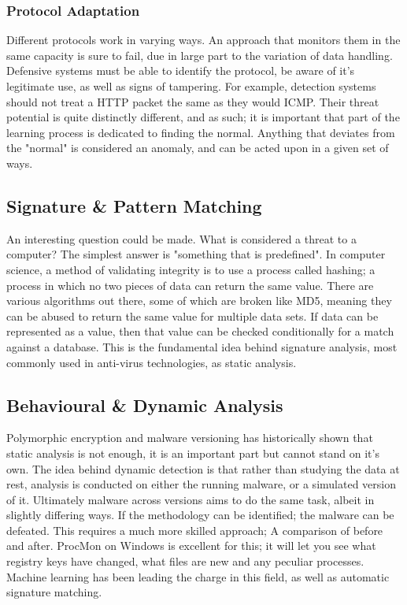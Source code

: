 \subsubsection{Protocol Adaptation}
Different protocols work in varying ways. An approach that monitors them in the same capacity is sure to fail, due in large part to the variation of data handling. Defensive systems must be able to identify the protocol,
be aware of it's legitimate use, as well as signs of tampering. For example, detection systems should not treat a HTTP packet the same as they would ICMP. Their threat potential is quite distinctly different, and as such;
it is important that part of the learning process is dedicated to finding the normal. Anything that deviates from the "normal" is considered an anomaly, and can be acted upon in a given set of ways.

\subsection{Signature \& Pattern Matching}
An interesting question could be made. What is considered a threat to a computer? The simplest answer is "something that is predefined". 
In computer science, a method of validating integrity is to use a process called hashing; a process in which no two pieces of data can return the same value. 
There are various algorithms out there, some of which are broken like MD5, meaning they can be abused to return the same value for multiple data sets. 
If data can be represented as a value, then that value can be checked conditionally for a match against a database. This is the fundamental idea behind signature analysis,
most commonly used in anti-virus technologies, as static analysis.


\subsection{Behavioural & Dynamic Analysis}
Polymorphic encryption and malware versioning has historically shown that static analysis is not enough, it is an important part but cannot stand on it's own. The idea behind dynamic detection is that rather than
studying the data at rest, analysis is conducted on either the running malware, or a simulated version of it. Ultimately malware across versions aims to do the same task, albeit in slightly differing ways. If the methodology
can be identified; the malware can be defeated. This requires a much more skilled approach; A comparison of before and after. ProcMon on Windows is excellent for this; it will let you see what registry keys have changed, what files are new and any peculiar processes.
Machine learning has been leading the charge in this field, as well as automatic signature matching.

